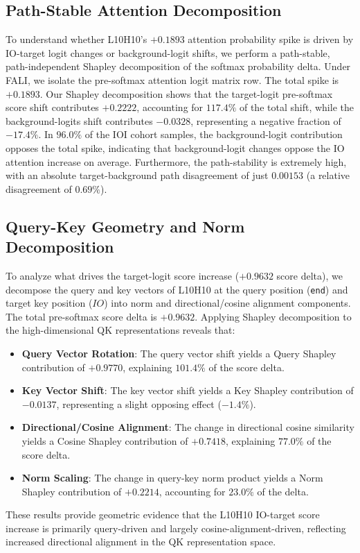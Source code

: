 \documentclass[10pt]{article} %
\begin{document}
\subsection{Path-Stable Attention Decomposition}
To understand whether L10H10's $+0.1893$ attention probability spike is driven by IO-target logit changes or background-logit shifts, we perform a path-stable, path-independent Shapley decomposition of the softmax probability delta. Under FALI, we isolate the pre-softmax attention logit matrix row. The total spike is $+0.1893$. Our Shapley decomposition shows that the target-logit pre-softmax score shift contributes $+0.2222$, accounting for $117.4\%$ of the total shift, while the background-logits shift contributes $-0.0328$, representing a negative fraction of $-17.4\%$. In $96.0\%$ of the IOI cohort samples, the background-logit contribution opposes the total spike, indicating that background-logit changes oppose the IO attention increase on average. Furthermore, the path-stability is extremely high, with an absolute target-background path disagreement of just $0.00153$ (a relative disagreement of $0.69\%$).

\subsection{Query-Key Geometry and Norm Decomposition}
To analyze what drives the target-logit score increase ($+0.9632$ score delta), we decompose the query and key vectors of L10H10 at the query position (\texttt{end}) and target key position ($IO$) into norm and directional/cosine alignment components. 
The total pre-softmax score delta is $+0.9632$. Applying Shapley decomposition to the high-dimensional QK representations reveals that:
\begin{itemize}
  \item \textbf{Query Vector Rotation}: The query vector shift yields a Query Shapley contribution of $+0.9770$, explaining $101.4\%$ of the score delta.
  \item \textbf{Key Vector Shift}: The key vector shift yields a Key Shapley contribution of $-0.0137$, representing a slight opposing effect ($-1.4\%$).
  \item \textbf{Directional/Cosine Alignment}: The change in directional cosine similarity yields a Cosine Shapley contribution of $+0.7418$, explaining $77.0\%$ of the score delta.
  \item \textbf{Norm Scaling}: The change in query-key norm product yields a Norm Shapley contribution of $+0.2214$, accounting for $23.0\%$ of the delta.
\end{itemize}
These results provide geometric evidence that the L10H10 IO-target score increase is primarily query-driven and largely cosine-alignment-driven, reflecting increased directional alignment in the QK representation space.
\end{document}
